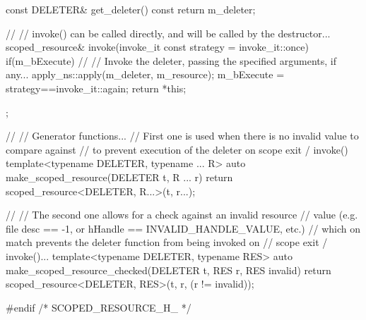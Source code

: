 \documentclass[ebook,11pt,article]{memoir}
\begin{document}
\begin{codeblock}
{	const DELETER& get_deleter() const
	{
		return m_deleter;
	}

	//
	// invoke() can be called directly, and will be called by the destructor...
	scoped_resource& invoke(invoke_it const strategy = invoke_it::once)
	{
		if(m_bExecute)
		{
			//
			// Invoke the deleter, passing the specified arguments, if any...
			apply_ns::apply(m_deleter, m_resource);
		}
		m_bExecute = strategy==invoke_it::again;
		return *this;
	}
};

//
// Generator functions...
// First one is used when there is no invalid value to compare against
// to prevent execution of the deleter on scope exit / invoke()
template<typename DELETER, typename ... R>
auto make_scoped_resource(DELETER t, R ... r)
{
	return scoped_resource<DELETER, R...>(t, r...);
}

//
// The second one allows for a check against an invalid resource
// value (e.g. file desc == -1, or hHandle == INVALID_HANDLE_VALUE, etc.)
// which on match prevents the deleter function from being invoked on
// scope exit / invoke()...
template<typename DELETER, typename RES>
auto make_scoped_resource_checked(DELETER t, RES r, RES invalid)
{
	return scoped_resource<DELETER, RES>(t, r, (r != invalid));
}

#endif /* SCOPED_RESOURCE_H_ */
\end{codeblock}
\end{document}
